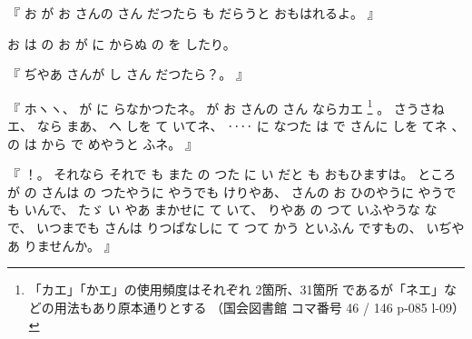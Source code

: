 %
『
お
が
お
さんの
さん
だつたら
も
だらうと
おもはれるよ。
』

%
お
は
の
お
が
に
からぬ
の
を
したり。

%
『
ぢやあ
さんが
し
さん
だつたら？。
』

%
『
ホヽヽ、
%
が
に
らなかつたネ。
%
が
お
さんの
さん%
ならカエ
\footnote{「カエ」「かエ」の使用頻度はそれぞれ 2箇所、31箇所 であるが「ネエ」などの用法もあり原本通りとする
（国会図書館 コマ番号 46 / 146 p-085 l-09）}%
。
%
さうさねエ、
%
なら
まあ、
%
へ
しを
て
いてネ、
%
‥‥
に
なつた
は
で
さんに
しを
てネ
、
%
%
の
は
から
で
めやうと
ふネ。
』

%
『
！。
%
それなら
それで
も
また
の
つた
に
い
だと
も
おもひますは。
%
ところが
の
さんは
の
つたやうに
やうでも
けりやあ、
%
さんの
お
ひのやうに
やうでも
いんで、
%
たゞ
い
やあ
まかせに
て
いて、
%
りやあ
の%
つて
いふやうな
な
で、
%
いつまでも
さんは
りつぱなしに
て
つて
かう
といふん
ですもの、
%
いぢやあ
りませんか。
』

